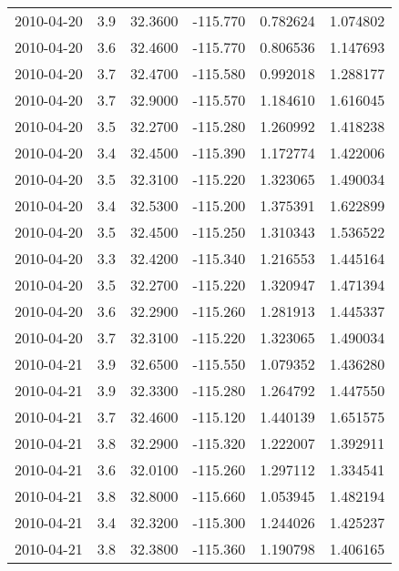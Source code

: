 \begin{tabular}{lrrrrr}
2010-04-20 &       3.9 &  32.3600 &  -115.770 &         0.782624 &         1.074802 \\
2010-04-20 &       3.6 &  32.4600 &  -115.770 &         0.806536 &         1.147693 \\
2010-04-20 &       3.7 &  32.4700 &  -115.580 &         0.992018 &         1.288177 \\
2010-04-20 &       3.7 &  32.9000 &  -115.570 &         1.184610 &         1.616045 \\
2010-04-20 &       3.5 &  32.2700 &  -115.280 &         1.260992 &         1.418238 \\
2010-04-20 &       3.4 &  32.4500 &  -115.390 &         1.172774 &         1.422006 \\
2010-04-20 &       3.5 &  32.3100 &  -115.220 &         1.323065 &         1.490034 \\
2010-04-20 &       3.4 &  32.5300 &  -115.200 &         1.375391 &         1.622899 \\
2010-04-20 &       3.5 &  32.4500 &  -115.250 &         1.310343 &         1.536522 \\
2010-04-20 &       3.3 &  32.4200 &  -115.340 &         1.216553 &         1.445164 \\
2010-04-20 &       3.5 &  32.2700 &  -115.220 &         1.320947 &         1.471394 \\
2010-04-20 &       3.6 &  32.2900 &  -115.260 &         1.281913 &         1.445337 \\
2010-04-20 &       3.7 &  32.3100 &  -115.220 &         1.323065 &         1.490034 \\
2010-04-21 &       3.9 &  32.6500 &  -115.550 &         1.079352 &         1.436280 \\
2010-04-21 &       3.9 &  32.3300 &  -115.280 &         1.264792 &         1.447550 \\
2010-04-21 &       3.7 &  32.4600 &  -115.120 &         1.440139 &         1.651575 \\
2010-04-21 &       3.8 &  32.2900 &  -115.320 &         1.222007 &         1.392911 \\
2010-04-21 &       3.6 &  32.0100 &  -115.260 &         1.297112 &         1.334541 \\
2010-04-21 &       3.8 &  32.8000 &  -115.660 &         1.053945 &         1.482194 \\
2010-04-21 &       3.4 &  32.3200 &  -115.300 &         1.244026 &         1.425237 \\
2010-04-21 &       3.8 &  32.3800 &  -115.360 &         1.190798 &         1.406165 \\

\end{tabular}
